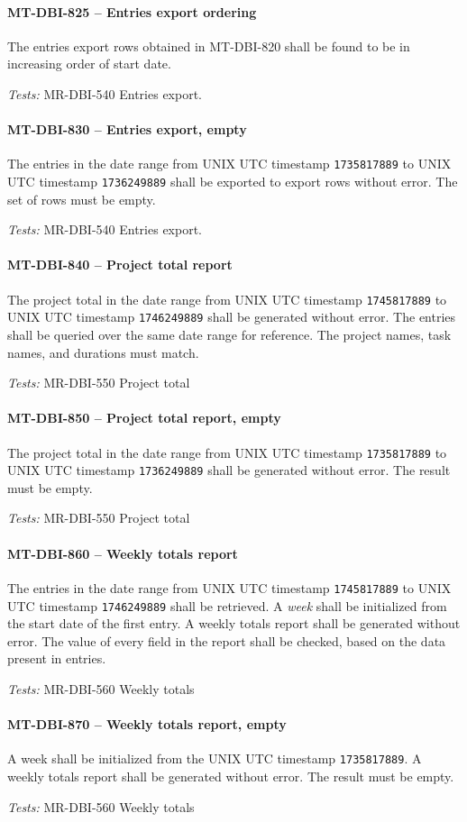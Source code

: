 \paragraph{MT-DBI-825 -- Entries export ordering}
The entries export rows obtained in MT-DBI-820 shall be found to
be in increasing order of start date.

\textit{Tests: } MR-DBI-540 Entries export.

\paragraph{MT-DBI-830 -- Entries export, empty}
The entries in the date range from UNIX UTC timestamp
\lstinline{1735817889} to UNIX UTC timestamp \lstinline{1736249889}
shall be exported to export rows without error. The set of rows must be empty.

\textit{Tests: } MR-DBI-540 Entries export.

\paragraph{MT-DBI-840 -- Project total report}
The project total in the date range from UNIX UTC timestamp
\lstinline{1745817889} to UNIX UTC timestamp \lstinline{1746249889} shall be
generated without error.
The entries shall be queried over the same date range for reference.
The project names, task names, and durations must match.

\textit{Tests: } MR-DBI-550 Project total

\paragraph{MT-DBI-850 -- Project total report, empty}
The project total in the date range from UNIX UTC timestamp
\lstinline{1735817889} to UNIX UTC timestamp \lstinline{1736249889}
shall be generated without error. The result must be empty.

\textit{Tests: } MR-DBI-550 Project total

\paragraph{MT-DBI-860 -- Weekly totals report}
The entries in the date range from UNIX UTC timestamp \lstinline{1745817889} to
UNIX UTC timestamp \lstinline{1746249889} shall be retrieved.
A \emph{week} shall be initialized from the start date of the first entry.
A weekly totals report shall be generated without error.
The value of every field in the report shall be checked, based on the data
present in entries.

\textit{Tests: } MR-DBI-560 Weekly totals

\paragraph{MT-DBI-870 -- Weekly totals report, empty}
A week shall be initialized from the UNIX UTC timestamp
\lstinline{1735817889}. A weekly totals report shall be generated without error.
The result must be empty.

\textit{Tests: } MR-DBI-560 Weekly totals
